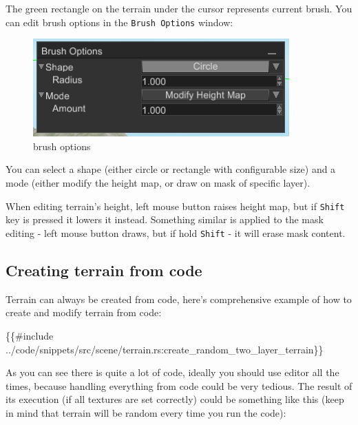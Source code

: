 \documentclass[
]{book}
\newenvironment{Shaded}{\begin{snugshade}}{\end{snugshade}}
\newcommand{\NormalTok}[1]{#1}
\theoremstyle{definition}
\theoremstyle{definition}
\theoremstyle{definition}
\theoremstyle{definition}
\theoremstyle{remark}
\begin{document}
The green rectangle on the terrain under the cursor represents current brush. You can edit brush options in the \texttt{Brush\ Options} window:

\begin{figure}
\centering
\includegraphics{images/scene_brush_options.png}
\caption{brush options}
\end{figure}

You can select a shape (either circle or rectangle with configurable size) and a mode (either modify the height map, or draw on mask of specific layer).

When editing terrain's height, left mouse button raises height map, but if \texttt{Shift} key is pressed it lowers it instead. Something similar is applied to the mask editing - left mouse button draws, but if hold \texttt{Shift} - it will erase mask content.

\subsection{Creating terrain from code}\label{creating-terrain-from-code}

Terrain can always be created from code, here's comprehensive example of how to create and modify terrain from code:

\begin{Shaded}
\begin{Highlighting}[]
\NormalTok{\{\{\#include ../code/snippets/src/scene/terrain.rs:create\_random\_two\_layer\_terrain\}\}}
\end{Highlighting}
\end{Shaded}

As you can see there is quite a lot of code, ideally you should use editor all the times, because handling everything from code could be very tedious. The result of its execution (if all textures are set correctly) could be something like this (keep in mind that terrain will be random every time you run the code):
\end{document}
